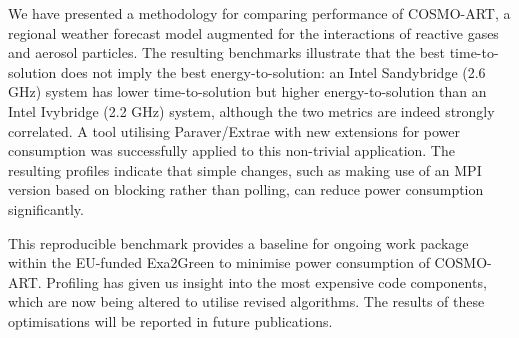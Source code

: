 We  have   presented  a  methodology  for   comparing  performance  of
COSMO-ART,  a  regional  weather  forecast  model  augmented  for  the
interactions of  reactive gases and aerosol  particles.  The resulting
benchmarks illustrate  that the  best time-to-solution does  not imply
the best energy-to-solution: an Intel Sandybridge (2.6 GHz) system has
lower  time-to-solution but  higher energy-to-solution  than  an Intel
Ivybridge  (2.2  GHz) system,  although  the  two  metrics are  indeed
strongly  correlated.   A   tool  utilising  Paraver/Extrae  with  new
extensions  for power  consumption  was successfully  applied to  this
non-trivial application.  The  resulting profiles indicate that simple
changes, such as making use of an MPI version based on blocking rather
than polling, can reduce power consumption significantly.

This  reproducible  benchmark provides  a  baseline  for ongoing  work
package within  the EU-funded Exa2Green to  minimise power consumption
of COSMO-ART. Profiling  has given us insight into  the most expensive
code  components,  which are  now  being  altered  to utilise  revised
algorithms.  The  results of these  optimisations will be  reported in
future publications.
